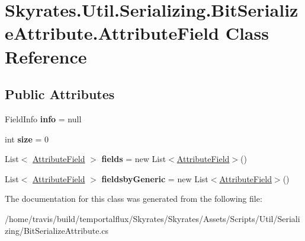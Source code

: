 \hypertarget{class_skyrates_1_1_util_1_1_serializing_1_1_bit_serialize_attribute_1_1_attribute_field}{\section{Skyrates.\-Util.\-Serializing.\-Bit\-Serialize\-Attribute.\-Attribute\-Field Class Reference}
\label{class_skyrates_1_1_util_1_1_serializing_1_1_bit_serialize_attribute_1_1_attribute_field}
}
\subsection*{Public Attributes}
\begin{DoxyCompactItemize}
\item 
\hypertarget{class_skyrates_1_1_util_1_1_serializing_1_1_bit_serialize_attribute_1_1_attribute_field_a910f1af02835b428d03c8642ded9d971}{Field\-Info {\bfseries info} = null}\label{class_skyrates_1_1_util_1_1_serializing_1_1_bit_serialize_attribute_1_1_attribute_field_a910f1af02835b428d03c8642ded9d971}

\item 
\hypertarget{class_skyrates_1_1_util_1_1_serializing_1_1_bit_serialize_attribute_1_1_attribute_field_a42dbea310ceac361a6053cf0526547bc}{int {\bfseries size} = 0}\label{class_skyrates_1_1_util_1_1_serializing_1_1_bit_serialize_attribute_1_1_attribute_field_a42dbea310ceac361a6053cf0526547bc}

\item 
\hypertarget{class_skyrates_1_1_util_1_1_serializing_1_1_bit_serialize_attribute_1_1_attribute_field_a0dd4db0c1eee3d691bf69ee4d39a7593}{List$<$ \hyperlink{class_skyrates_1_1_util_1_1_serializing_1_1_bit_serialize_attribute_1_1_attribute_field}{Attribute\-Field} $>$ {\bfseries fields} = new List$<$\hyperlink{class_skyrates_1_1_util_1_1_serializing_1_1_bit_serialize_attribute_1_1_attribute_field}{Attribute\-Field}$>$()}\label{class_skyrates_1_1_util_1_1_serializing_1_1_bit_serialize_attribute_1_1_attribute_field_a0dd4db0c1eee3d691bf69ee4d39a7593}

\item 
\hypertarget{class_skyrates_1_1_util_1_1_serializing_1_1_bit_serialize_attribute_1_1_attribute_field_a3933c03b9bb3602ff4ccc58951f5ae2d}{List$<$ \hyperlink{class_skyrates_1_1_util_1_1_serializing_1_1_bit_serialize_attribute_1_1_attribute_field}{Attribute\-Field} $>$ {\bfseries fieldsby\-Generic} = new List$<$\hyperlink{class_skyrates_1_1_util_1_1_serializing_1_1_bit_serialize_attribute_1_1_attribute_field}{Attribute\-Field}$>$()}\label{class_skyrates_1_1_util_1_1_serializing_1_1_bit_serialize_attribute_1_1_attribute_field_a3933c03b9bb3602ff4ccc58951f5ae2d}

\end{DoxyCompactItemize}


The documentation for this class was generated from the following file\-:\begin{DoxyCompactItemize}
\item 
/home/travis/build/temportalflux/\-Skyrates/\-Skyrates/\-Assets/\-Scripts/\-Util/\-Serializing/Bit\-Serialize\-Attribute.\-cs\end{DoxyCompactItemize}
